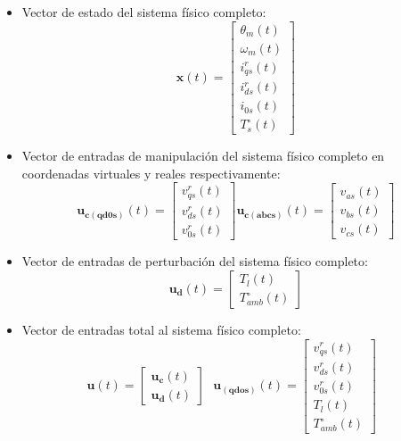 \documentclass[a4paper, 10pt, onecolumn,journal]{ieeeconf}
\begin{document}
\begin{itemize}
    \item Vector de estado del sistema físico completo:
    \begin{equation}
        \mathbf{x}(t) = \begin{bmatrix} \theta_m(t) \\ \omega_m(t) \\ i^r_{qs}(t) \\ i^r_{ds}(t) \\ i_{0s}(t) \\ T^{\circ}_s(t) \end{bmatrix}
        \label{vector de estado del sistema}
    \end{equation}
    \item Vector de entradas de manipulación del sistema físico completo en coordenadas virtuales y reales respectivamente:
    \begin{equation}
        \mathbf{u_{c(qd0s)}}(t) = \begin{bmatrix} v^r_{qs}(t) \\ v^r_{ds}(t) \\ v^r_{0s}(t)\end{bmatrix}
        \mathbf{u_{c(abcs)}}(t) = \begin{bmatrix} v_{as}(t) \\ v_{bs}(t) \\ v_{cs}(t)\end{bmatrix}
        \label{vector de entradas de control}
    \end{equation}
    \item Vector de entradas de perturbación del sistema físico completo:
    \begin{equation}
        \mathbf{u_{d}}(t) = \begin{bmatrix} T_l(t) \\ T_{amb}^{\circ}(t)\end{bmatrix}
        \label{vector de entradas de perturbacion}
    \end{equation}
    \item Vector de entradas total al sistema físico completo:
    \begin{equation}
        \mathbf{u}(t) = \begin{bmatrix} \mathbf{u_c}(t) \\ \mathbf{u_d}(t)\end{bmatrix} \, \, \, \,
        \mathbf{u_{(qdos)}}(t) = \begin{bmatrix} v^r_{qs}(t) \\ v^r_{ds}(t) \\ v^r_{0s}(t) \\ T_l(t) \\ T_{amb}^{\circ}(t) \end{bmatrix}\, \, \, \,

\end{equation}
\end{itemize}
\end{document}
